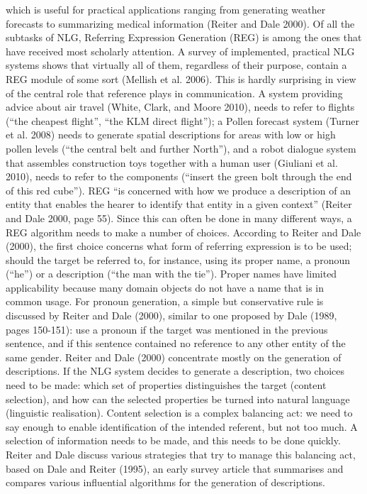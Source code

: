 which is useful for practical applications
ranging from generating weather forecasts to summarizing medical information (Reiter
and Dale 2000). Of all the subtasks of NLG, Referring Expression Generation (REG) is
among the ones that have received most scholarly attention. A survey of implemented,
practical  NLG  systems  shows  that  virtually  all  of  them,  regardless  of  their  purpose,
contain a REG module of some sort (Mellish et al. 2006). This is hardly surprising in
view  of  the  central  role  that  reference  plays  in  communication.  A  system  providing
advice about air travel (White, Clark, and Moore 2010), needs to refer to flights (``the
cheapest  flight'',  ``the  KLM  direct  flight'');  a  Pollen  forecast  system  (Turner  et  al.
2008)  needs  to  generate  spatial  descriptions  for  areas  with  low  or  high  pollen  levels
(``the  central  belt  and  further  North''),  and  a  robot  dialogue  system  that  assembles
construction toys together with a human user (Giuliani et al. 2010), needs to refer to the
components (``insert the green bolt through the end of this red cube'').
REG ``is concerned with how we produce a description of an entity that enables
the hearer to identify that entity in a given context'' (Reiter and Dale 2000, page 55).
Since this can often be done in many different ways, a REG algorithm needs to make a
number of choices. According to Reiter and Dale (2000), the first choice concerns what
form
of referring expression is to be used; should the target be referred to, for instance,
using  its  proper  name,  a  pronoun  (``he'')  or  a  description  (``the  man  with  the  tie'').
Proper  names  have  limited  applicability  because  many  domain  objects  do  not  have
a name that is in common usage. For pronoun generation, a simple but conservative
rule  is  discussed  by  Reiter  and  Dale  (2000),  similar  to  one  proposed  by  Dale  (1989,
pages 150-151): use a pronoun if the target was mentioned in the previous sentence,
and  if  this  sentence  contained  no  reference  to  any  other  entity  of  the  same  gender.
Reiter  and  Dale  (2000)  concentrate  mostly  on  the  generation  of  descriptions.  If  the
NLG  system  decides  to  generate  a  description,  two  choices  need  to  be  made:  which
set of properties distinguishes the target (content selection), and how can the selected
properties be turned into natural language (linguistic realisation). Content selection is a
complex balancing act: we need to say enough to enable identification of the intended
referent, but not too much. A selection of information needs to be made, and this needs
to be done quickly. Reiter and Dale discuss various strategies that try to manage this
balancing act, based on Dale and Reiter (1995), an early survey article that summarises
and compares various influential algorithms for the generation of descriptions.

